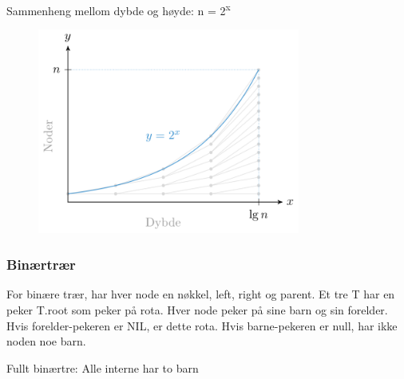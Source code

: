 \documentclass[12pt]{report}
\begin{document}
\par


\vspace{\baselineskip}

\vspace{\baselineskip}

\vspace{\baselineskip}
{\fontsize{13pt}{15.6pt}\selectfont Sammenheng mellom dybde og høyde: n = 2\textsuperscript{x}\par}\par




\begin{figure}[H]
	\begin{Center}
		\includegraphics[width=3.4in,height=2.66in]{./media/image74.png}
	\end{Center}
\end{figure}



 \par

\subsubsection*{Binærtrær}
For binære trær, har hver node en nøkkel, left, right og parent. Et tre T har en peker T.root som peker på rota. Hver node peker på sine barn og sin forelder. Hvis forelder-pekeren er NIL, er dette rota. Hvis barne-pekeren er null, har ikke noden noe barn.\par


\vspace{\baselineskip}
\setlength{\parskip}{0.0pt}
Fullt binærtre: Alle interne har to barn \par
\end{document}
